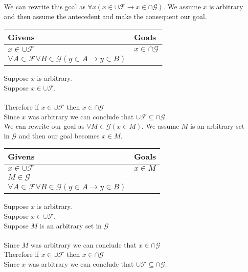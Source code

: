\documentclass{article}
\newcommand{\n}{ \noindent }
\newcommand{\F}{\mathcal{F}}
\newcommand{\G}{\mathcal{G}}
\begin{document}
\n We can rewrite this goal as $\forall x(x \in \cup \F \rightarrow x \in \cap \G)$. We assume $x$ is arbitrary and then assume the antecedent and make the consequent our goal. \\

\begin{table}[h]
\begin{tabular}{ll}
\hline
Givens & Goals   \\ \hline
$x \in \cup \F$ & $x \in \cap \G$   \\ 
$\forall A \in \F \forall B \in \G(y \in A \rightarrow y \in B)$ & \\ \hline
\end{tabular}
\end{table}

\n Suppose $x$ is arbitrary. \\
\indent Suppose $x \in \cup \F$.\\
\indent \indent [proof of $x \in \cap \G$] \\
\indent Therefore if $x \in \cup \F$ then $x \in \cap \G$ \\
\n Since $x$ was arbitrary we can conclude that $\cup \F \subseteq \cap \G$. \\

\n We can rewrite our goal as $\forall M \in \G(x \in M)$. We assume $M$ is an arbitrary set in $\G$ and then our goal becomes $x \in M$.


\begin{table}[h]
\begin{tabular}{ll}
\hline
Givens & Goals   \\ \hline
$x \in \cup \F$ & $x \in M$   \\ 
$M \in \G$ & \\
$\forall A \in \F \forall B \in \G(y \in A \rightarrow y \in B)$ & \\ \hline
\end{tabular}
\end{table}

\n Suppose $x$ is arbitrary. \\
\indent Suppose $x \in \cup \F$.\\
\indent \indent Suppose $M$ is an arbitrary set in $\G$ \\
\indent \indent \indent [proof of $x \in M$] \\
\indent \indent Since $M$ was arbitrary we can conclude that $x \in \cap \G$ \\
\indent Therefore if $x \in \cup \F$ then $x \in \cap \G$ \\
\n Since $x$ was arbitrary we can conclude that $\cup \F \subseteq \cap \G$. \\
\end{document}

